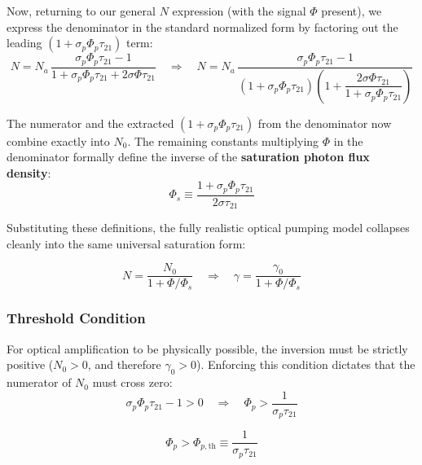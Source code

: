 Now, returning to our general $N$ expression (with the signal $\Phi$ present), we express the denominator in the standard normalized form by factoring out the leading $(1 + \sigma_p\Phi_p\tau_{21})$ term:
\begin{equation*}
    N = N_a\,\frac{\sigma_p\Phi_p\tau_{21} - 1}{1 + \sigma_p\Phi_p\tau_{21} + 2\sigma\Phi\tau_{21}} \quad \Longrightarrow \quad N = N_a\,\frac{\sigma_p\Phi_p\tau_{21} - 1}{(1 + \sigma_p\Phi_p\tau_{21})\!\left(1 + \dfrac{2\sigma\Phi\tau_{21}}{1 + \sigma_p\Phi_p\tau_{21}}\right)}
\end{equation*}

The numerator and the extracted $(1 + \sigma_p\Phi_p\tau_{21})$ from the denominator now combine exactly into $N_0$. The remaining constants multiplying $\Phi$ in the denominator formally define the inverse of the \textbf{saturation photon flux density}:
\begin{equation*}
    \Phi_s \equiv \frac{1 + \sigma_p\Phi_p\tau_{21}}{2\sigma\tau_{21}}
\end{equation*}

Substituting these definitions, the fully realistic optical pumping model collapses cleanly into the same universal saturation form:
\begin{keyresult}
    \begin{equation}
        N = \frac{N_0}{1 + \Phi/\Phi_s} \quad \Longrightarrow \quad \gamma = \frac{\gamma_0}{1 + \Phi/\Phi_s}
    \end{equation}
\end{keyresult}

\subsubsection*{Threshold Condition}

For optical amplification to be physically possible, the inversion must be strictly positive ($N_0 > 0$, and therefore $\gamma_0 > 0$). Enforcing this condition dictates that the numerator of $N_0$ must cross zero:
\begin{equation*}
    \sigma_p\Phi_p\tau_{21} - 1 > 0 \quad \Longrightarrow \quad \Phi_p > \frac{1}{\sigma_p\tau_{21}}
\end{equation*}
\begin{keyresult}
    \begin{equation}
        \Phi_p > \Phi_{p,\text{th}} \equiv \frac{1}{\sigma_p\tau_{21}}
    \end{equation}
\end{keyresult}

